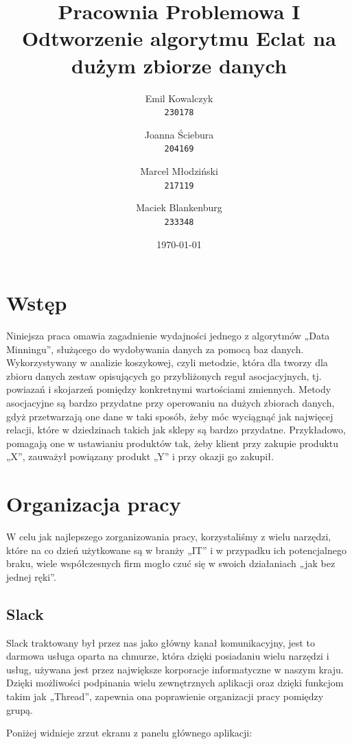 \documentclass{article}
\author{
  Emil Kowalczyk\\
  \texttt{230178}
  \and
  Joanna Ściebura\\
  \texttt{204169}
  \and
  Marcel Młodziński\\
  \texttt{217119}
  \and
  Maciek Blankenburg\\
  \texttt{233348}
  \and
}
\title{ Pracownia Problemowa I \\
  \large Odtworzenie algorytmu Eclat na dużym zbiorze danych }
\date{\today}
\begin{document}
	
    \maketitle	
    \clearpage
   
    \tableofcontents
    \clearpage
    
	\section{Wstęp}
		Niniejsza praca omawia zagadnienie wydajności jednego z algorytmów „Data Minningu”, służącego do wydobywania danych za pomocą baz danych. Wykorzystywany w analizie koszykowej, czyli metodzie, która dla tworzy dla zbioru danych zestaw opisujących go przybliżonych reguł asocjacyjnych, tj. powiazań i skojarzeń pomiędzy konkretnymi wartościami zmiennych. Metody asocjacyjne są bardzo przydatne przy operowaniu na dużych zbiorach danych, gdyż przetwarzają one dane w taki sposób, żeby móc wyciągnąć jak najwięcej relacji, które w dziedzinach takich jak sklepy są bardzo przydatne. Przykładowo, pomagają one w ustawianiu produktów tak, żeby klient przy zakupie produktu „X”, zauważył powiązany produkt „Y” i przy okazji go zakupił.   
		
	\section{Organizacja pracy}
		W celu jak najlepszego zorganizowania pracy, korzystaliśmy z wielu narzędzi, które na co dzień użytkowane są w branży „IT” i w przypadku ich potencjalnego braku, wiele współczesnych firm mogło czuć się w swoich działaniach „jak bez jednej ręki”. 	
		
		\subsection{Slack}
		
	Slack traktowany był przez nas jako główny kanał komunikacyjny, jest to darmowa usługa oparta na chmurze, która dzięki posiadaniu wielu narzędzi i usług, używana jest przez największe korporacje informatyczne w naszym kraju. Dzięki możliwości podpinania wielu zewnętrznych aplikacji oraz dzięki funkcjom takim jak „Thread”, zapewnia ona poprawienie organizacji pracy pomiędzy grupą. 

Poniżej widnieje zrzut ekranu z panelu głównego aplikacji:
 		
\end{document}
